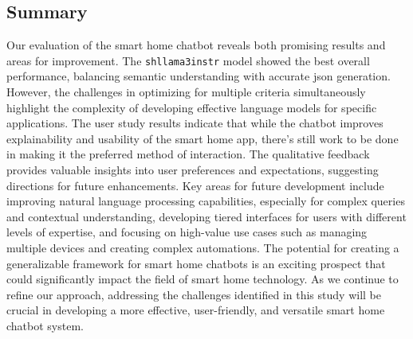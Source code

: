 \subsection{Summary}
Our evaluation of the smart home chatbot reveals both promising results and areas for improvement. The \texttt{shllama3instr} model showed the best overall performance, balancing semantic understanding with accurate \gls{json} generation. However, the challenges in optimizing for multiple criteria simultaneously highlight the complexity of developing effective language models for specific applications.
The user study results indicate that while the chatbot improves explainability and usability of the smart home app, there's still work to be done in making it the preferred method of interaction. The qualitative feedback provides valuable insights into user preferences and expectations, suggesting directions for future enhancements.
Key areas for future development include improving natural language processing capabilities, especially for complex queries and contextual understanding, developing tiered interfaces for users with different levels of expertise, and focusing on high-value use cases such as managing multiple devices and creating complex automations.
The potential for creating a generalizable framework for smart home chatbots is an exciting prospect that could significantly impact the field of smart home technology. As we continue to refine our approach, addressing the challenges identified in this study will be crucial in developing a more effective, user-friendly, and versatile smart home chatbot system.

